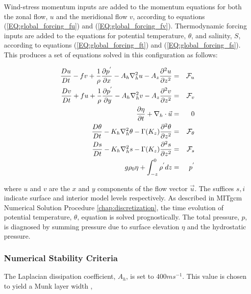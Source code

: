 Wind-stress momentum inputs are added to the momentum equations for both
the zonal flow, $u$ and the meridional flow $v$, according to equations 
(\ref{EQ:global_forcing_fu}) and (\ref{EQ:global_forcing_fv}).
Thermodynamic forcing inputs are added to the equations for
potential temperature, $\theta$, and salinity, $S$, according to equations 
(\ref{EQ:global_forcing_ft}) and (\ref{EQ:global_forcing_fs}).
This produces a set of equations solved in this configuration as follows:


\begin{eqnarray}
\label{EQ:model_equations}
\frac{Du}{Dt} - fv + 
  \frac{1}{\rho}\frac{\partial p^{'}}{\partial x} - 
  A_{h}\nabla_{h}^2u - A_{z}\frac{\partial^{2}u}{\partial z^{2}} 
& = &
{\cal F}_{u}
\\
\frac{Dv}{Dt} + fu + 
  \frac{1}{\rho}\frac{\partial p^{'}}{\partial y} - 
  A_{h}\nabla_{h}^2v - A_{z}\frac{\partial^{2}v}{\partial z^{2}} 
& = &
{\cal F}_{v}
\\
\frac{\partial \eta}{\partial t} + \nabla_{h}\cdot \vec{u}
&=&
0
\\
\frac{D\theta}{Dt} -
 K_{h}\nabla_{h}^2\theta  - \Gamma(K_{z})\frac{\partial^{2}\theta}{\partial z^{2}} 
& = &
{\cal F}_{\theta}
\\
\frac{D s}{Dt} -
 K_{h}\nabla_{h}^2 s  - \Gamma(K_{z})\frac{\partial^{2} s}{\partial z^{2}} 
& = &
{\cal F}_{s}
\\
g\rho_{0} \eta + \int^{0}_{-z}\rho^{'} dz & = & p^{'}
\\
\end{eqnarray}

\noindent where $u$ and $v$ are the $x$ and $y$ components of the
flow vector $\vec{u}$. The suffices ${s},{i}$ indicate surface and
interior model levels respectively. As described in
MITgcm Numerical Solution Procedure \ref{chap:discretization}, the time 
evolution of potential temperature, $\theta$, equation is solved prognostically.
The total pressure, $p$, is diagnosed by summing pressure due to surface 
elevation $\eta$ and the hydrostatic pressure.
\\

\subsubsection{Numerical Stability Criteria}

The Laplacian dissipation coefficient, $A_{h}$, is set to $400 m s^{-1}$.
This value is chosen to yield a Munk layer width \cite{adcroft:95},


